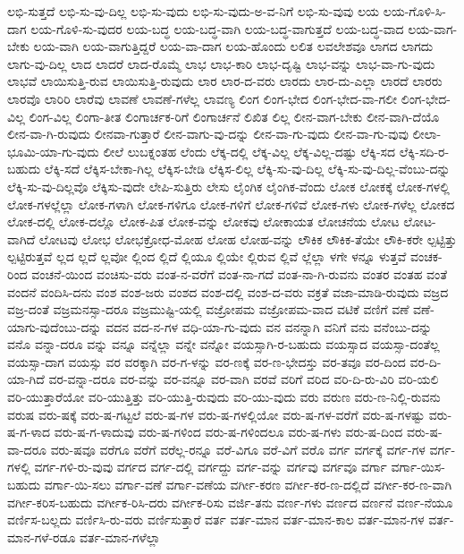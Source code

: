 {ಲಭಿ-ಸುತ್ತದೆ
ಲಭಿ-ಸು-ವು-ದಿಲ್ಲ
ಲಭಿ-ಸು-ವುದು
ಲಭಿ-ಸು-ವುದು-ಅ-ವ-ನಿಗೆ
ಲಭಿ-ಸು-ವುವು
ಲಯ
ಲಯ-ಗೊಳಿ-ಸಿ-ದಾಗ
ಲಯ-ಗೊಳಿ-ಸು-ವುದರ
ಲಯ-ಬದ್ಧ
ಲಯ-ಬದ್ಧ-ವಾಗಿ
ಲಯ-ಬದ್ಧ-ವಾಗುತ್ತದೆ
ಲಯ-ಬದ್ಧ-ವಾದ
ಲಯ-ವಾಗ-ಬೇಕು
ಲಯ-ವಾಗಿ
ಲಯ-ವಾಗುತ್ತಿದ್ದರೆ
ಲಯ-ವಾ-ದಾಗ
ಲಯ-ಹೊಂದು
ಲಲಿತ
ಲವಲೇಶವೂ
ಲಾಗದ
ಲಾಗದು
ಲಾಗು-ವು-ದಿಲ್ಲ
ಲಾದ
ಲಾದರೆ
ಲಾದ-ರೊಮ್ಮೆ
ಲಾಭ
ಲಾಭ-ಕಾರಿ
ಲಾಭ-ದೃಷ್ಟಿ
ಲಾಭ-ವನ್ನು
ಲಾಭ-ವಾ-ಗು-ವುದು
ಲಾಭವೆ
ಲಾಯಿಸುತ್ತಿ-ರುವ
ಲಾಯಿಸುತ್ತಿ-ರುವುದು
ಲಾರ
ಲಾರ-ದ-ವರು
ಲಾರದು
ಲಾರ-ದು-ಎಲ್ಲಾ
ಲಾರದೆ
ಲಾರರು
ಲಾರವೊ
ಲಾರಿರಿ
ಲಾರೆವು
ಲಾವಣೆ
ಲಾವಣೆ-ಗಳೆಲ್ಲ
ಲಾವಣ್ಯ
ಲಿಂಗ
ಲಿಂಗ-ಭೇದ
ಲಿಂಗ-ಭೇದ-ವಾ-ಗಲೀ
ಲಿಂಗ-ಭೇದ-ವಿಲ್ಲ
ಲಿಂಗ-ವಿಲ್ಲ
ಲಿಂಗಾ-ತೀತ
ಲಿಂಗಾರ್ಚಕ-ರಿಗೆ
ಲಿಂಗಾರ್ಚನೆ
ಲಿಖಿತ
ಲಿಲ್ಲ
ಲೀನ-ವಾಗ-ಬೇಕು
ಲೀನ-ವಾಗಿ-ದೆಯೊ
ಲೀನ-ವಾ-ಗಿ-ರುವುದು
ಲೀನವಾ-ಗುತ್ತಾರೆ
ಲೀನ-ವಾಗು-ವು-ದನ್ನು
ಲೀನ-ವಾ-ಗು-ವುದು
ಲೀನ-ವಾ-ಗು-ವುವು
ಲೀಲಾ-ಭೂಮಿ-ಯಾ-ಗು-ವುದು
ಲೀಲೆ
ಲುಬಕ್ನಂತಹ
ಲೆಂದು
ಲೆಕ್ಕ-ದಲ್ಲಿ
ಲೆಕ್ಕ-ವಿಲ್ಲ
ಲೆಕ್ಕ-ವಿಲ್ಲ-ದಷ್ಟು
ಲೆಕ್ಕಿ-ಸದ
ಲೆಕ್ಕಿ-ಸದಿ-ರ-ಬಹುದು
ಲೆಕ್ಕಿ-ಸದೆ
ಲೆಕ್ಕಿಸ-ಬೇಕಾ-ಗಿಲ್ಲ
ಲೆಕ್ಕಿಸ-ಬೇಡಿ
ಲೆಕ್ಕಿಸ-ಲಿಲ್ಲ
ಲೆಕ್ಕಿ-ಸು-ವು-ದಿಲ್ಲ
ಲೆಕ್ಕಿ-ಸು-ವು-ದಿಲ್ಲ-ವೆಂಬು-ದನ್ನು
ಲೆಕ್ಕಿ-ಸು-ವು-ದಿಲ್ಲವೊ
ಲೆಕ್ಕಿಸು-ವುದೇ
ಲೇಪಿ-ಸುತ್ತಿರು
ಲೇಸು
ಲೈಂಗಿಕ
ಲೈಂಗಿಕ-ವೆಂದು
ಲೋಕ
ಲೋಕಕ್ಕೆ
ಲೋಕ-ಗಳಲ್ಲಿ
ಲೋಕ-ಗಳಲ್ಲೆಲ್ಲಾ
ಲೋಕ-ಗಳಾಗಿ
ಲೋಕ-ಗಳಿಗೂ
ಲೋಕ-ಗಳಿಗೆ
ಲೋಕ-ಗಳಿವೆ
ಲೋಕ-ಗಳು
ಲೋಕ-ಗಳೆಲ್ಲ
ಲೋಕದ
ಲೋಕ-ದಲ್ಲಿ
ಲೋಕ-ದಲ್ಲೊ
ಲೋಕ-ಪಿತ
ಲೋಕ-ವನ್ನು
ಲೋಕವು
ಲೋಕಾಯತ
ಲೋಚನೆಯ
ಲೋಟ
ಲೋಟ-ವಾಗಿದೆ
ಲೋಟವು
ಲೋಭ
ಲೋಭಕ್ರೋಧ-ಮೋಹ
ಲೋಹ
ಲೋಹ-ವನ್ನು
ಲೌಕಿಕ
ಲೌಕಿಕ-ತೆಯೇ
ಲೌಕಿ-ಕರೇ
ಲ್ಪಟ್ಟಿತ್ತು
ಲ್ಪಟ್ಟಿರುತ್ತವೆ
ಲ್ಲದ
ಲ್ಲದೆ
ಲ್ಲವೋ
ಲ್ಲಿಂದ
ಲ್ಲಿದೆ
ಲ್ಲಿಯೂ
ಲ್ಲಿಯೇ
ಲ್ಲಿರುವ
ಲ್ಲಿವೆ
ಲ್ಲೆಲ್ಲಾ
ಳಗೇ
ಳನ್ನೂ
ಳುತ್ತವೆ
ವಂಚಕ-ರಿಂದ
ವಂಚನೆ-ಯಿಂದ
ವಂಚಿಸು-ವರು
ವಂತ-ನ-ವರೆಗೆ
ವಂತ-ನಾ-ಗದೆ
ವಂತ-ನಾ-ಗಿ-ರುವನು
ವಂತರ
ವಂತಹ
ವಂತೆ
ವಂದನೆ
ವಂದಿಸಿ-ದನು
ವಂಶ
ವಂಶ-ಜರು
ವಂಶದ
ವಂಶ-ದಲ್ಲಿ
ವಂಶ-ದ-ವರು
ವಕ್ರತೆ
ವಜಾ-ಮಾಡಿ-ರುವುದು
ವಜ್ರದ
ವಜ್ರ-ದಂತೆ
ವಜ್ರಮನಸ್ಸಾ-ದರೂ
ವಜ್ರಮುಷ್ಟಿ-ಯಲ್ಲಿ
ವಜ್ರೋಪಮ
ವಜ್ರೋಪಮ-ವಾದ
ವಟಿಕೆ
ವಣಿಗೆ
ವಣೆ
ವಣೆ-ಯಾಗು-ವುದೆಂಬು-ದನ್ನು
ವದನ
ವದ-ನ-ಗಳ
ವಧಿ-ಯಾ-ಗು-ವುದು
ವನ
ವನನ್ನಾಗಿ
ವನಿಗೆ
ವನು
ವನೆಂಬು-ದನ್ನು
ವನೊ
ವನ್ನಾ-ದರೂ
ವನ್ನು
ವನ್ನೂ
ವನ್ನೆಲ್ಲಾ
ವನ್ನೇ
ವನ್ನೋ
ವಯಸ್ಸಾಗಿ-ರ-ಬಹುದು
ವಯಸ್ಸಾದ
ವಯಸ್ಸಾ-ದಂತೆಲ್ಲ
ವಯಸ್ಸಾ-ದಾಗ
ವಯಸ್ಸು
ವರ
ವರಕ್ಕಾಗಿ
ವರ-ಗ-ಳನ್ನು
ವರ-ಣಕ್ಕೆ
ವರ-ಣ-ಭೇದಸ್ತು
ವರ-ತವೂ
ವರ-ದಿಂದ
ವರ-ದಿ-ಯಾ-ಗಿದೆ
ವರ-ವನ್ನಾ-ದರೂ
ವರ-ವನ್ನು
ವರ-ವನ್ನೂ
ವರ-ವಾಗಿ
ವರವೆ
ವರಿಗೆ
ವರಿದ
ವರಿ-ದಿ-ರು-ವಿರಿ
ವರಿ-ಯಲಿ
ವರಿ-ಯುತ್ತಾರೆಯೋ
ವರಿ-ಯುತ್ತಿತ್ತು
ವರಿ-ಯುತ್ತಿ-ರುವುದು
ವರಿ-ಯು-ವುದು
ವರು
ವರುಣ
ವರು-ಣ-ನಿಲ್ಲಿ-ರುವನು
ವರುಷ
ವರು-ಷಕ್ಕೆ
ವರು-ಷ-ಗಟ್ಟಲೆ
ವರು-ಷ-ಗಳ
ವರು-ಷ-ಗಳಲ್ಲಿಯೋ
ವರು-ಷ-ಗಳ-ವರೆಗೆ
ವರು-ಷ-ಗಳಷ್ಟು
ವರು-ಷ-ಗ-ಳಾದ
ವರು-ಷ-ಗ-ಳಾದುವು
ವರು-ಷ-ಗಳಿಂದ
ವರು-ಷ-ಗಳಿಂದಲೂ
ವರು-ಷ-ಗಳು
ವರು-ಷ-ದಿಂದ
ವರು-ಷ-ವಾ-ದರೂ
ವರು-ಷವೂ
ವರೆಗೂ
ವರೆಗೆ
ವರೆಲ್ಲ-ರನ್ನೂ
ವರೆ-ವಿಗೂ
ವರೆ-ವಿಗೆ
ವರೊ
ವರ್ಗ
ವರ್ಗಕ್ಕೆ
ವರ್ಗ-ಗಳ
ವರ್ಗ-ಗಳಲ್ಲಿ
ವರ್ಗ-ಗಳಿ-ರು-ವುವು
ವರ್ಗದ
ವರ್ಗ-ದಲ್ಲಿ
ವರ್ಗದ್ದು
ವರ್ಗ-ವನ್ನು
ವರ್ಗವು
ವರ್ಗವೂ
ವರ್ಗಾ
ವರ್ಗಾ-ಯಿಸ-ಬಹುದು
ವರ್ಗಾ-ಯಿ-ಸಲು
ವರ್ಗಾ-ವಣೆ
ವರ್ಗಾ-ವಣೆಯ
ವರ್ಗೀ-ಕರಣ
ವರ್ಗೀ-ಕರ-ಣ-ದಲ್ಲಿದೆ
ವರ್ಗೀ-ಕರ-ಣ-ವಾಗಿ
ವರ್ಗೀ-ಕರಿಸ-ಬಹುದು
ವರ್ಗೀಕ-ರಿಸಿ-ದರು
ವರ್ಗೀಕ-ರಿಸು
ವರ್ಜಿ-ತನು
ವರ್ಣ-ಗಳು
ವರ್ಣದ
ವರ್ಣನೆ
ವರ್ಣ-ನೆಯೂ
ವರ್ಣಿಸ-ಬಲ್ಲದು
ವರ್ಣಿಸಿ-ರು-ವರು
ವರ್ಣಿಸುತ್ತಾರೆ
ವರ್ತ
ವರ್ತ-ಮಾನ
ವರ್ತ-ಮಾನ-ಕಾಲ
ವರ್ತ-ಮಾನ-ಗಳ
ವರ್ತ-ಮಾನ-ಗಳೆ-ರಡೂ
ವರ್ತ-ಮಾನ-ಗಳೆಲ್ಲಾ
}
